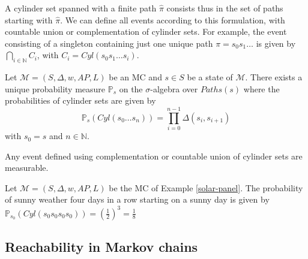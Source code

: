A cylinder set spanned with a finite path $\hat{\pi}$ consists thus in the set of paths starting with $\hat{\pi}$.
We can define all events according to this formulation,
with countable union or complementation of cylinder sets. For example, the event consisting of a singleton containing just one unique path $\pi = s_0s_1\dots$ is given by $\bigcap_{i \in \mathbb{N}} C_i$, with $C_i = Cyl(s_0s_1\dots s_i)$.

\begin{theorem}\label{theo1}
  Let $\mathcal{M}=(S, \Delta, w, AP, L)$ be an MC and $s \in S$ be a state of $\mathcal{M}$. There exists a unique probability measure $\mathbb{P}_s$ on the
  $\sigma$-algebra over $Paths(s)$ where the probabilities of cylinder sets are given by
  \[
    \mathbb{P}_s(Cyl(s_0 \dots s_n)) = \prod_{i = 0}^{n - 1} \Delta(s_i, s_{i+1})
  \]
  with $s_0 = s$ and $n \in \mathbb{N}$.%
\end{theorem}
\begin{corollary}
Any event defined using complementation or countable union of cylinder sets are measurable.
\end{corollary}

\begin{example}
  Let $\mathcal{M} = (S, \Delta, w, AP, L)$ be the MC of Example \ref{solar-panel}. The probability of sunny weather four days in a row starting on a sunny day is given
  by $\mathbb{P}_{s_0}(Cyl(s_0s_0s_0s_0)) = (\frac{1}{2})^3 = \frac{1}{8}$
\end{example}

\subsection{Reachability in Markov chains} \label{obj-MC}

